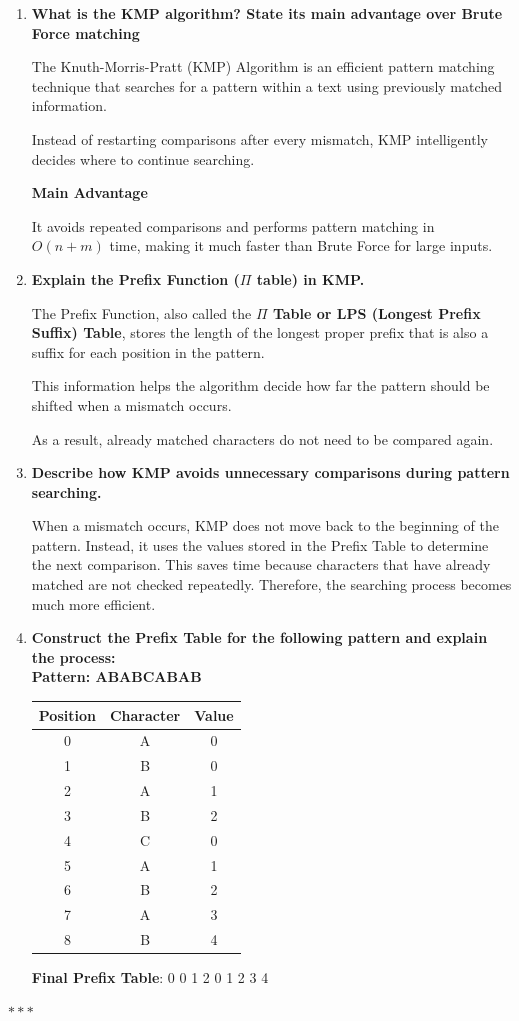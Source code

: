 
\begin{enumerate}[label=\textbf{\Alph*.}]

\item \textbf{What is the KMP algorithm? State its main advantage over Brute Force
matching}

The Knuth-Morris-Pratt (KMP) Algorithm is an efficient pattern matching technique
that searches for a pattern within a text using previously matched information.

Instead of restarting comparisons after every mismatch, KMP intelligently decides
where to continue searching.

\textbf{Main Advantage}

It avoids repeated comparisons and performs pattern matching in $O(n + m)$ time,
making it much faster than Brute Force for large inputs.

\item \textbf{Explain the Prefix Function ($\Pi$ table) in KMP.}

The Prefix Function, also called the {\bfseries $\Pi$ Table or LPS (Longest
Prefix Suffix) Table}, stores the length of the longest proper prefix that is
also a suffix for each position in the pattern.

This information helps the algorithm decide how far the pattern should be shifted
when a mismatch occurs.

As a result, already matched characters do not need to be compared again.

\item \textbf{Describe how KMP avoids unnecessary comparisons during pattern searching.}

When a mismatch occurs, KMP does not move back to the beginning of the pattern.
Instead, it uses the values stored in the Prefix Table to determine the next comparison.
This saves time because characters that have already matched are not checked repeatedly.
Therefore, the searching process becomes much more efficient.

\item \textbf{Construct the Prefix Table for the following pattern and explain the process:\\
Pattern: ABABCABAB}

\begin{tabular}{|c|c|c|}
\hline
Position & Character & Value\\
\hline
0 & A & 0\\
1 & B & 0\\
2 & A & 1\\
3 & B & 2\\
4 & C & 0\\
5 & A & 1\\
6 & B & 2\\
7 & A & 3\\
8 & B & 4\\
\hline
\end{tabular}

\textbf{Final Prefix Table}: 0 0 1 2 0 1 2 3 4

\end{enumerate}

\begin{center}
\vspace{1cm}
$\ast \ast \ast$
\end{center}
\newpage
